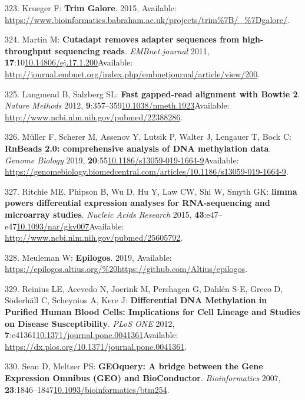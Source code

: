 \documentclass[
]{book}
\begin{document}
\leavevmode\hypertarget{ref-Krueger2015}{}%
323. Krueger F: \textbf{Trim Galore}. 2015, Available: \url{https://www.bioinformatics.babraham.ac.uk/projects/trim\%7B/_\%7Dgalore/}.

\leavevmode\hypertarget{ref-Martin2011}{}%
324. Martin M: \textbf{Cutadapt removes adapter sequences from high-throughput sequencing reads}. \emph{EMBnet.journal} 2011, \textbf{17}:10\href{https://doi.org/10.14806/ej.17.1.200}{10.14806/ej.17.1.200}Available: \url{http://journal.embnet.org/index.php/embnetjournal/article/view/200}.

\leavevmode\hypertarget{ref-Langmead2012}{}%
325. Langmead B, Salzberg SL: \textbf{Fast gapped-read alignment with Bowtie 2}. \emph{Nature Methods} 2012, \textbf{9}:357--359\href{https://doi.org/10.1038/nmeth.1923}{10.1038/nmeth.1923}Available: \url{http://www.ncbi.nlm.nih.gov/pubmed/22388286}.

\leavevmode\hypertarget{ref-Muller2019}{}%
326. Müller F, Scherer M, Assenov Y, Lutsik P, Walter J, Lengauer T, Bock C: \textbf{RnBeads 2.0: comprehensive analysis of DNA methylation data}. \emph{Genome Biology} 2019, \textbf{20}:55\href{https://doi.org/10.1186/s13059-019-1664-9}{10.1186/s13059-019-1664-9}Available: \url{https://genomebiology.biomedcentral.com/articles/10.1186/s13059-019-1664-9}.

\leavevmode\hypertarget{ref-Ritchie2015}{}%
327. Ritchie ME, Phipson B, Wu D, Hu Y, Law CW, Shi W, Smyth GK: \textbf{limma powers differential expression analyses for RNA-sequencing and microarray studies}. \emph{Nucleic Acids Research} 2015, \textbf{43}:e47--e47\href{https://doi.org/10.1093/nar/gkv007}{10.1093/nar/gkv007}Available: \url{http://www.ncbi.nlm.nih.gov/pubmed/25605792}.

\leavevmode\hypertarget{ref-Meuleman2019}{}%
328. Meuleman W: \textbf{Epilogos}. 2019, Available: \url{https://epilogos.altius.org/\%20https://github.com/Altius/epilogos}.

\leavevmode\hypertarget{ref-Reinius2012}{}%
329. Reinius LE, Acevedo N, Joerink M, Pershagen G, Dahlén S-E, Greco D, Söderhäll C, Scheynius A, Kere J: \textbf{Differential DNA Methylation in Purified Human Blood Cells: Implications for Cell Lineage and Studies on Disease Susceptibility}. \emph{PLoS ONE} 2012, \textbf{7}:e41361\href{https://doi.org/10.1371/journal.pone.0041361}{10.1371/journal.pone.0041361}Available: \url{https://dx.plos.org/10.1371/journal.pone.0041361}.

\leavevmode\hypertarget{ref-Davis2007p}{}%
330. Sean D, Meltzer PS: \textbf{GEOquery: A bridge between the Gene Expression Omnibus (GEO) and BioConductor}. \emph{Bioinformatics} 2007, \textbf{23}:1846--1847\href{https://doi.org/10.1093/bioinformatics/btm254}{10.1093/bioinformatics/btm254}.
\end{document}
